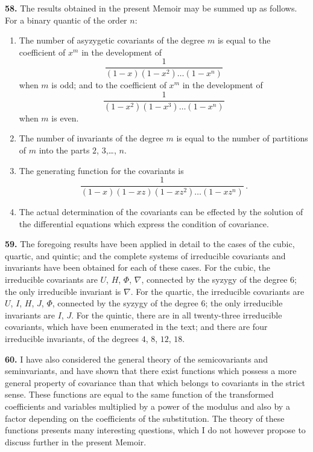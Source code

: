 \documentclass[11pt,a4paper]{article}
\begin{document}
\textbf{58.} The results obtained in the present Memoir may be summed up as follows. For a binary quantic of the order $n$:
\begin{enumerate}[label=(\arabic*)]
\item The number of asyzygetic covariants of the degree $m$ is equal to the coefficient of $x^{m}$ in the development of
\[
\frac{1}{(1-x)(1-x^{2})\ldots(1-x^{n})}
\]
when $m$ is odd; and to the coefficient of $x^{m}$ in the development of
\[
\frac{1}{(1-x^{2})(1-x^{3})\ldots(1-x^{n})}
\]
when $m$ is even.
\item The number of invariants of the degree $m$ is equal to the number of partitions of $m$ into the parts $2$, $3$,\ldots, $n$.
\item The generating function for the covariants is
\[
\frac{1}{(1-x)(1-xz)(1-xz^{2})\ldots(1-xz^{n})}\,.
\]
\item The actual determination of the covariants can be effected by the solution of the differential equations which express the condition of covariance.
\end{enumerate}

\textbf{59.} The foregoing results have been applied in detail to the cases of the cubic, quartic, and quintic; and the complete systems of irreducible covariants and invariants have been obtained for each of these cases. For the cubic, the irreducible covariants are $U$, $H$, $\Phi$, $\nabla$, connected by the syzygy of the degree $6$; the only irreducible invariant is $\nabla$. For the quartic, the irreducible covariants are $U$, $I$, $H$, $J$, $\Phi$, connected by the syzygy of the degree $6$; the only irreducible invariants are $I$, $J$. For the quintic, there are in all twenty-three irreducible covariants, which have been enumerated in the text; and there are four irreducible invariants, of the degrees $4$, $8$, $12$, $18$.

\clearpage
\setcounter{page}{272}

\textbf{60.} I have also considered the general theory of the semicovariants and seminvariants, and have shown that there exist functions which possess a more general property of covariance than that which belongs to covariants in the strict sense. These functions are equal to the same function of the transformed coefficients and variables multiplied by a power of the modulus and also by a factor depending on the coefficients of the substitution. The theory of these functions presents many interesting questions, which I do not however propose to discuss further in the present Memoir.
\end{document}
